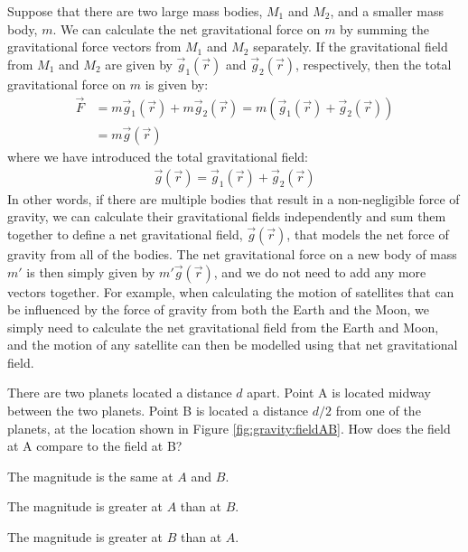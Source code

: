 Suppose that there are two large mass bodies, $M_1$ and $M_2$, and a smaller mass body, $m$. We can calculate the net gravitational force on $m$ by summing the gravitational force vectors from $M_1$ and $M_2$ separately. If the gravitational field from $M_1$ and $M_2$ are given by $\vec g_1(\vec r)$ and $\vec g_2(\vec r)$, respectively, then the total gravitational force on $m$ is given by:
\begin{align*}
\vec F &= m\vec g_1(\vec r) + m\vec g_2(\vec r)=m(\vec g_1(\vec r)+\vec g_2(\vec r))\\
&=m \vec g(\vec r)
\end{align*}
where we have introduced the total gravitational field:
\begin{align*}
\vec g(\vec r) = \vec g_1(\vec r)+\vec g_2(\vec r)
\end{align*}
In other words, if there are multiple bodies that result in a non-negligible force of gravity, we can calculate their gravitational fields independently and sum them together to define a net gravitational field, $\vec g(\vec r)$, that models the net force of gravity from all of the bodies. The net gravitational force on a new body of mass $m'$ is then simply given by $m'\vec g(\vec r)$, and we do not need to add any more vectors together. For example, when calculating the motion of satellites that can be influenced by the force of gravity from both the Earth and the Moon, we simply need to calculate the net gravitational field from the Earth and Moon, and the motion of any satellite can then be modelled using that net gravitational field.

\begin{checkpoint}
\begin{MCquestion}{There are two planets located a distance $d$ apart. Point A is located midway between the two planets. Point B is located a distance $d/2$ from one of the planets, at the location shown in Figure \ref{fig:gravity:fieldAB}. How does the field at A compare to the field at B?}
\item The magnitude is the same at $A$ and $B$.
\item The magnitude is greater at $A$ than at $B$.
\item The magnitude is greater at $B$ than at $A$. \correct
\end{MCquestion}
\end{checkpoint}

